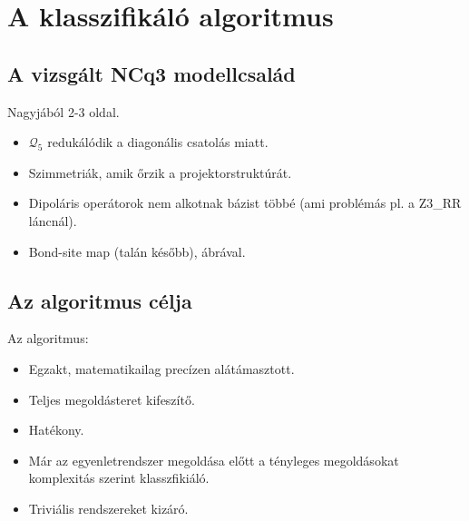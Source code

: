 \documentclass[12pt,a4paper,oneside]{report}
\newcommand{\Q}{\mathcal{Q}}
\begin{document}
\chapter{A klasszifikáló algoritmus}
\section{A vizsgált NCq3 modellcsalád}
Nagyjából 2-3 oldal.
\begin{itemize}
    \item $\Q_5$ redukálódik a diagonális csatolás miatt.
    \item Szimmetriák, amik őrzik a projektorstruktúrát.
    \item Dipoláris operátorok nem alkotnak bázist többé (ami problémás pl. a Z3\_RR láncnál).
    \item Bond-site map (talán később), ábrával.
\end{itemize}

\section{Az algoritmus célja}
Az algoritmus:
\begin{itemize}
    \item Egzakt, matematikailag precízen alátámasztott.
    \item Teljes megoldásteret kifeszítő.
    \item Hatékony.
    \item Már az egyenletrendszer megoldása előtt a tényleges megoldásokat komplexitás szerint klasszfikiáló.
    \item Triviális rendszereket kizáró.
\end{itemize}
\end{document}
